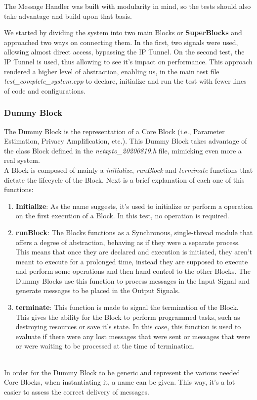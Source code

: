 \begin{refsection}
The Message Handler was built with modularity in mind, so the tests should also 
take advantage and build upon that basis. 

We started by dividing the system into two main Blocks or \textbf{SuperBlocks} 
and approached two ways on connecting them. In the first, two signals were used, 
allowing almost direct access, bypassing the IP Tunnel. On the second test, the 
IP Tunnel is used, thus allowing to see it's impact on performance. This approach 
rendered a higher level of abstraction, enabling us, in the main test file 
\textit{test\_complete\_system.cpp} to declare, initialize and run the test with 
fewer lines of code and configurations.

\subsubsection{Dummy Block}

The Dummy Block is the representation of a Core Block 
(i.e., Parameter Estimation, Privacy Amplification, etc.). 
This  Dummy Block takes advantage of the class Block defined in the 
\textit{netxpto\_20200819.h} file, mimicking even more a real system. 
\\
A Block is composed of mainly a \textit{initialize}, \textit{runBlock} and 
\textit{terminate} functions that dictate the lifecycle of the Block. Next is 
a brief explanation of each one of this functions:
\\
\begin{enumerate}
	\item \textbf{Initialize}: As the name suggests, it's used to initialize 
		or perform a operation on the first execution of a Block. In this test, 
		no operation is required.
	\item \textbf{runBlock}: The Blocks functions as a Synchronous, single-thread 
		module that offers a degree of abstraction, behaving as if they were a 
		separate process. This means that once they are declared and execution is 
		initiated, they aren't meant to execute for a prolonged time, instead they 
		are supposed to execute and perform some operations and then hand control 
		to the other Blocks. The Dummy Blocks use this function to process messages 
		in the Input Signal and generate messages to be placed in the Output Signals.
	\item \textbf{terminate}: This function is made to signal the termination of 
		the Block. This gives the ability for the Block to perform programmed tasks, 
		such as destroying resources or save it's state. In this case, this function 
		is used to evaluate if there were any lost messages that were sent or messages 
		that were or were waiting to be processed at the time of termination.
\end{enumerate}
\\
In order for the Dummy Block to be generic and represent the various needed Core Blocks, 
when instantiating it, a name can be given. This way, it's a lot easier to assess the 
correct delivery of messages.


\end{refsection}
